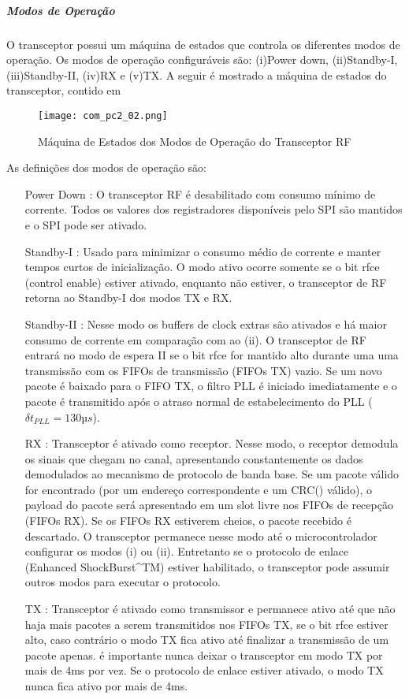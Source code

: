\subparagraph{Modos de Operação}
O transceptor possui um máquina de estados que controla os diferentes modos de operação. Os modos de operação configuráveis são: (i)Power down, (ii)Standby-I, (iii)Standby-II, (iv)RX e (v)TX. A seguir é mostrado a máquina de estados do transceptor, contido em \citep{bib_com_01_yas}
\begin{figure}[H]
\centering
	\label{com_pc2_02}
	\texttt{[image: com\_pc2\_02.png]}
   \caption{Máquina de Estados dos Modos de Operação do Transceptor RF}
\end{figure}

As definições dos modos de operação são:
\begin{itemize}
	\item[Power Down]: O transceptor RF é desabilitado com consumo mínimo de corrente. Todos os valores dos registradores disponíveis pelo SPI são mantidos e o SPI pode ser ativado.
	\item[Standby-I]: Usado para minimizar o consumo médio de corrente e manter tempos curtos de inicialização. O modo ativo ocorre somente se o bit rfce (control enable) estiver ativado, enquanto não estiver, o transceptor de RF retorna ao Standby-I dos modos TX e RX.
	\item[Standby-II]: Nesse modo os buffers de clock extras são ativados e há maior consumo de corrente em comparação com ao (ii). O transceptor de RF entrará no modo de espera II se o bit rfce for mantido alto durante uma uma transmissão com os FIFOs de transmissão (FIFOs TX) vazio. Se um novo pacote é baixado para o FIFO TX, o filtro PLL é iniciado imediatamente e o pacote é transmitido após o atraso normal de estabelecimento do PLL ($\delta t _ {PLL} = 130µs$).
	\item[RX]: Transceptor é ativado como receptor. Nesse modo, o receptor demodula os sinais que chegam no canal, apresentando constantemente os dados demodulados ao mecanismo de protocolo de banda base. Se um pacote válido for encontrado (por um endereço correspondente e um CRC() válido), o payload do pacote será apresentado em um slot livre nos FIFOs de recepção (FIFOs RX). Se os FIFOs RX estiverem cheios, o pacote recebido é descartado.
	O transceptor permanece nesse modo até o microcontrolador configurar os modos (i) ou (ii). Entretanto se o protocolo de enlace (Enhanced ShockBurst^{TM}) estiver habilitado, o transceptor pode assumir outros modos para executar o protocolo.
	\item[TX]: Transceptor é ativado como transmissor e permanece ativo até que não haja mais pacotes a serem transmitidos nos FIFOs TX, se o bit rfce estiver alto, caso contrário o modo TX fica ativo até finalizar a transmissão de um pacote apenas. é importante nunca deixar o transceptor em modo TX por mais de 4ms por vez. Se o protocolo de enlace estiver ativado, o modo TX nunca fica ativo por mais de 4ms.
\end{itemize}

